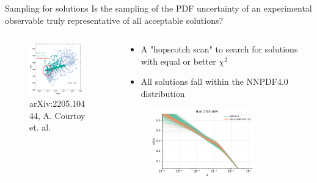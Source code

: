 \documentclass[aspectratio=169,9pt]{beamer}
\begin{document}
\begin{frame}[t]{Sampling for solutions}
    Is the sampling of the PDF uncertainty of an experimental observable truly representative of all acceptable solutions?\\
    \begin{columns}
        \begin{column}{0.4\textwidth}
            \begin{figure}
                \includegraphics[width=0.9\textwidth]{cteq}
                \caption*{arXiv:2205.10444, A. Courtoy et. al.}
            \end{figure}
        \end{column}
        \begin{column}{0.6\textwidth}
            \begin{itemize}
                \item A "hopscotch scan" to search for solutions with equal or better $\chi^2$
                \item All solutions fall within the NNPDF4.0 distribution
            \end{itemize}
            \begin{figure}
                \includegraphics[width=0.75\textwidth]{cteq_ubar}
            \end{figure}
        \end{column}
    \end{columns}
\end{frame}
\end{document}
